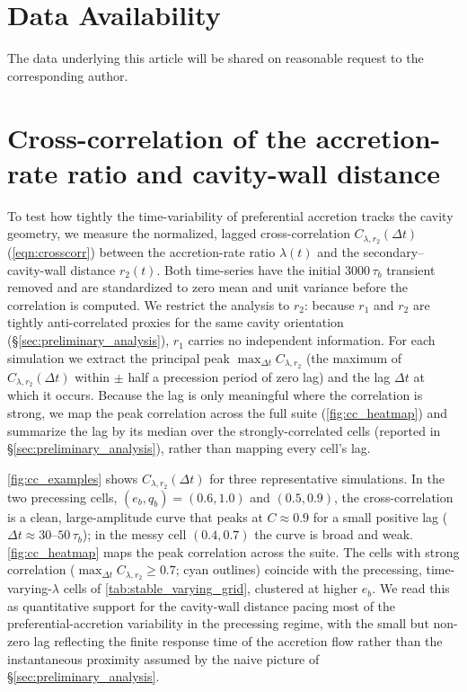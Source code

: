 \documentclass[fleqn,usenatbib]{mnras}
\begin{document}
\section*{Data Availability}
The data underlying this article will be shared on reasonable request to the corresponding author.




\appendix

\section{Cross-correlation of the accretion-rate ratio and cavity-wall distance}\label{sec:appendix_crosscorr}

To test how tightly the time-variability of preferential accretion tracks the cavity geometry, we measure the normalized, lagged cross-correlation $C_{\lambda, r_2}(\Delta t)$ (\autoref{eqn:crosscorr}) between the accretion-rate ratio $\lambda(t)$ and the secondary--cavity-wall distance $r_2(t)$. Both time-series have the initial $3000\,\tau_b$ transient removed and are standardized to zero mean and unit variance before the correlation is computed. We restrict the analysis to $r_2$: because $r_1$ and $r_2$ are tightly anti-correlated proxies for the same cavity orientation (\S\ref{sec:preliminary_analysis}), $r_1$ carries no independent information. For each simulation we extract the principal peak $\max_{\Delta t} C_{\lambda, r_2}$ (the maximum of $C_{\lambda, r_2}(\Delta t)$ within $\pm$ half a precession period of zero lag) and the lag $\Delta t$ at which it occurs. Because the lag is only meaningful where the correlation is strong, we map the peak correlation across the full suite (\autoref{fig:cc_heatmap}) and summarize the lag by its median over the strongly-correlated cells (reported in \S\ref{sec:preliminary_analysis}), rather than mapping every cell's lag.

\autoref{fig:cc_examples} shows $C_{\lambda, r_2}(\Delta t)$ for three representative simulations. In the two precessing cells, $(e_b, q_b) = (0.6, 1.0)$ and $(0.5, 0.9)$, the cross-correlation is a clean, large-amplitude curve that peaks at $C \approx 0.9$ for a small positive lag ($\Delta t \approx 30$--$50\,\tau_b$); in the messy cell $(0.4, 0.7)$ the curve is broad and weak. \autoref{fig:cc_heatmap} maps the peak correlation across the suite. The cells with strong correlation ($\max_{\Delta t} C_{\lambda, r_2} \ge 0.7$; cyan outlines) coincide with the precessing, time-varying-$\lambda$ cells of \autoref{tab:stable_varying_grid}, clustered at higher $e_b$. We read this as quantitative support for the cavity-wall distance pacing most of the preferential-accretion variability in the precessing regime, with the small but non-zero lag reflecting the finite response time of the accretion flow rather than the instantaneous proximity assumed by the naive picture of \S\ref{sec:preliminary_analysis}.
\end{document}
